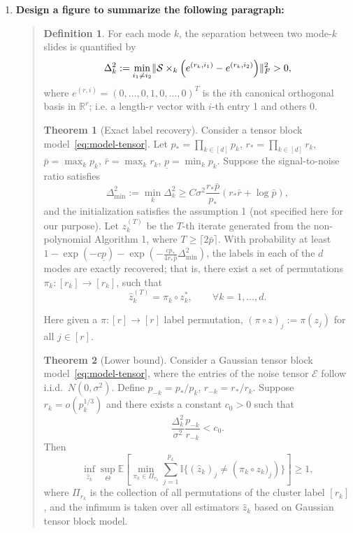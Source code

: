 \documentclass[11pt]{article}
\theoremstyle{plain}
\theoremstyle{definition}
\newtheorem{defn}{Definition}
\newtheorem{Theorem}{Theorem}
\newcommand{\cS}{\mathcal{S}}
\newcommand{\cE}{{\mathcal{E}}}
\newcommand{\0}{{\mathbf{0}}}
\newcommand{\1}{{\mathbf{1}}}
\newcommand{\bbR}{\mathbb{R}}
\newcommand{\bbI}{\mathbb{I}}
\newcommand{\bbE}{\mathbb{E}}
\begin{document}
\begin{enumerate}
\item {\bf Design a figure to summarize the following paragraph:}
\vspace{-.7cm}
\begin{quote}
\begin{defn}
For each mode $k$, the separation between two mode-$k$ slides is quantified by
\begin{equation}\label{eq:delta-define}
	\Delta_k^2 := \min_{i_1 \neq i_2} \FnormSize{}{\cS \times_k \left(e^{(r_k, i_1)} - e^{(r_k, i_2)} \right)}^2 > 0,
\end{equation}
where $e^{(r, i)}=(0,\ldots,0,1,0,\ldots,0)^T$ is the $i$th canonical orthogonal basis in $\bbR^r$; i.e. a length-$r$ vector with $i$-th entry 1 and others 0. 
\end{defn}
\begin{Theorem}[Exact label recovery]\label{coro:strong-consistency}
Consider a tensor block model~\eqref{eq:model-tensor}. Let $p_* = \prod_{k\in [d]} p_k$, $r_* = \prod_{k\in [d]} r_k$, $\bar p = \max_k p_k$, $\bar r = \max_k r_k$, $\underline p = \min_k p_k$. Suppose the signal-to-noise ratio satisfies
\begin{equation}\label{ineq:SNR-local-convergence}
	\Delta_{\min}^2 := \min_k \Delta_k^2 \geq C\sigma^2  \frac{r_* \bar p}{p_*}\left(r_*\bar r + \log \bar p\right),
\end{equation}
and the initialization satisfies the assumption 1 (not specified here for our purpose). Let $z^{(T)}_k$ be the $T$-th iterate generated from the non-polynomial Algorithm 1, where $T \geq \lceil2 \bar p \rceil$. With probability at least $1-\exp(-c\underline p)-\exp\left(-\frac{c p_*}{4r_{*}\bar p}\Delta_{\min}^2\right)$, the labels in each of the $d$ modes are exactly recovered; that is,
there exist a set of permutations $\pi_k\colon [r_k]\to [r_k]$, such that
	\begin{equation}
		\hat z_k^{(T)} = \pi_k \circ z_k^*,\qquad \forall k=1,\ldots,d.
	\end{equation}
\end{Theorem}
Here given a $\pi\colon [r]\to [r]$ label permutation, $(\pi\circ z)_j := \pi(z_j)$ for all $j\in[r]$.

\begin{Theorem}[Lower bound]\label{thm:mcr-lower-bound}
Consider a Gaussian tensor block model~\eqref{eq:model-tensor}, where the entries of the noise tensor $\cE$ follow i.i.d.\ $N(0,\sigma^2)$. Define $p_{-k}=p_*/p_k$, $r_{-k}=r_*/r_k$. Suppose $r_k = o(p_k^{1/3})$ and there exists a constant $c_0>0$ such that
\[
\frac{\Delta_k^2}{\sigma^2}\frac{p_{-k}}{r_{-k}} < c_0.
\]
Then
	\begin{equation}
		\inf_{\hat z_k} \sup_{\Theta} \bbE \left[\min_{\pi_k \in \Pi_{r_k}}\sum_{j=1}^{p_k}\bbI\{(\hat z_k)_j \neq \left(\pi_k\circ z_k)_j\right)\}\right] \geq 1, 
	\end{equation}
	where $\Pi_{r_k}$ is the collection of all permutations of the cluster label $[r_k]$, and the infimum is taken over all estimators $\hat z_k$ based on Gaussian tensor block model.
\end{Theorem}


\end{quote}
\end{enumerate}
\end{document}
